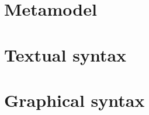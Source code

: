 \chapter{Metamodel}\label{cha:metamodel}


\chapter{Textual syntax}\label{cha:textual}


\chapter{Graphical syntax}\label{cha:graphical}



